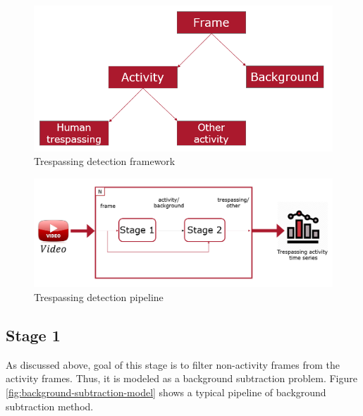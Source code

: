 \begin{figure}
    \centering
    \includegraphics[width=\linewidth]{images/trespassing-detection-framework.PNG}
    \caption{Trespassing detection framework}
    \label{fig:trespassing-detection-framework}
\end{figure}

\begin{figure}
    \centering
    \includegraphics[width=\linewidth]{images/trespassing-detection-pipeline.PNG}
    \caption{Trespassing detection pipeline}
    \label{fig:trespassing-detection-pipeline}
\end{figure}

\subsection{Stage 1}
As discussed above, goal of this stage is to filter non-activity frames from the activity frames. Thus, it is modeled as a background subtraction problem. Figure \ref{fig:background-subtraction-model} shows a typical pipeline of background subtraction method. 

